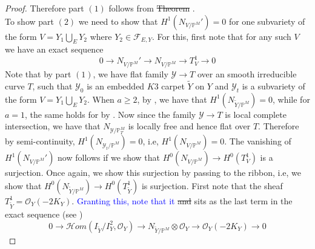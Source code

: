 \documentclass[11pt,twoside]{amsart}
\theoremstyle{plain}
\numberwithin{equation}{section}
\theoremstyle{definition}
\begin{document}
\begin{proof}
Therefore part $(1)$ follows from \sout{Theorem} \cite[Theorem $2.10$]{BGM24}. \\
To show part $(2)$ we need to show that $H^1(N_{V/\mathbb{P}^M}') = 0$ for one subvariety of the form $V = Y_1 \bigcup_E Y_2$ where $Y_2 \in \mathcal{F}_{E,Y}$. For this, first note that for any such $V$ we have an exact sequence 
$$0 \to N_{V/\mathbb{P}^M}' \to N_{V/\mathbb{P}^M} \to T_V^1 \to 0$$
Note that by part $(1)$, we have flat family $\mathcal{Y} \to T$ over an smooth irreducible curve $T$, such that $\mathcal{Y}_0$ is an embedded $K3$ carpet $\widetilde{Y}$ on $Y$ and $\mathcal{Y}_t$ is a subvariety of the form $V = Y_1 \bigcup_E Y_2$. When $a \geq 2$, by \cite[Theorem $5.1$, equation $(5.9)$]{BMR21}, we have that $H^1(N_{\widetilde{Y}/\mathbb{P}^M}) = 0$, while for $a = 1$, the same holds for by \cite[Theorem $4.1$]{GP97}. Now since the family $\mathcal{Y} \to T$ is local complete intersection, we have that $N_{\mathcal{Y}/\mathbb{P}_T^M}$ is locally free and hence flat over $T$. Therefore by semi-continuity, $H^1(N_{\mathcal{Y}_t/\mathbb{P}^M}) = 0$, i.e, $H^1(N_{V/\mathbb{P}^M}) = 0$. The vanishing of $H^1(N_{V/\mathbb{P}^M}')$ now follows if we show that $H^0(N_{V/\mathbb{P}^M}) \to H^0(T_V^1)$ is a surjection. Once again, we show this surjection by passing to the ribbon, i.e, we show that $H^0(N_{\widetilde{Y}/\mathbb{P}^M}) \to H^0(T_{\widetilde{Y}}^1)$ is surjection. First note that the sheaf $T_{\widetilde{Y}}^1 = \mathcal{O}_Y(-2K_Y)$. \textcolor{blue}{Granting this, note that it} \sout{and} sits as the last term in the exact sequence (see ) 
\begin{equation*}
    0 \to \mathcal{H}om(I_{\widetilde{Y}}/I_{Y}^2, \mathcal{O}_Y) \to N_{\widetilde{Y}/\mathbb{P}^M} \otimes \mathcal{O}_Y \to \mathcal{O}_Y(-2K_Y) \to 0
\end{equation*}


\end{proof}
\end{document}

